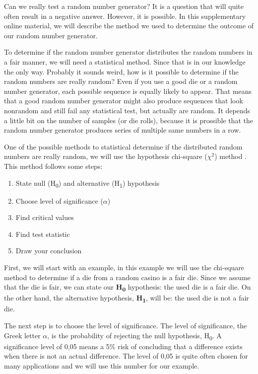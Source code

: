 Can we really test a random number generator? It is a question that will quite often result in a negative answer. However, it is possible. In this supplementary online material, we will describe the method we used to determine the outcome of our random number generator.

To determine if the random number generator distributes the random numbers in a fair manner, we will need a statistical method. Since that is in our knowledge the only way. Probably it sounds weird, how is it possible to determine if the random numbers are really random? Even if you use a good die or a random number generator, each possible sequence is equally likely to appear. That means that a good random number generator might also produce sequences that look nonrandom and still fail any statistical test, but actually are random. It depends a little bit on the number of samples (or die rolls), because it is prossible that the random number generator produces series of multiple same numbers in a row.

One of the possible methods to statistical determine if the distributed random numbers are really random, we will use the hypothesis chi-square (${\chi}^2$) method \cite{chisquareRandom} \cite{chisquare}. This method follows some steps:

\begin{enumerate}
	\itemsep0em
	\item State null (H\textsubscript{0}) and alternative (H\textsubscript{1}) hypothesis
	\item Choose level of significance ($\alpha$)
	\item Find critical values 
	\item Find test statistic
	\item Draw your conclusion
\end{enumerate}


First, we will start with an example, in this example we will use the chi-square method to determine if a die from a random casino is a fair die. Since we assume that the die is fair, we can state our \textbf{H\textsubscript{0}} hypothesis: the used die is a fair die. On the other hand, the alternative hypothesis, \textbf{H\textsubscript{1}}, will be: the used die is not a fair die.

The next step is to choose the level of significance. The level of significance, the Greek letter $\alpha$, is the probability of rejecting the null hypothesis, H\textsubscript{0}. A significance level of 0,05 means a 5\% risk of concluding that a difference exists when there is not an actual difference. The level of 0,05 is quite often chosen for many applications and we will use this number for our example.

